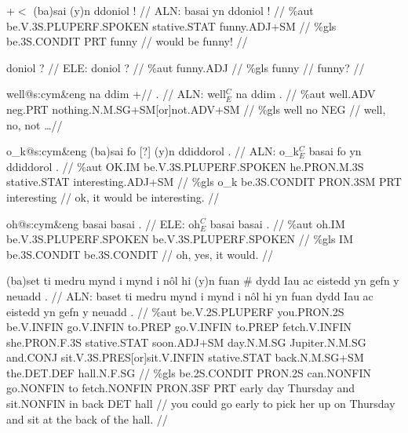 \documentclass[a4paper,10pt]{article}
\begin{document}
\ex
\begingl[lingstyle=gergl]
\glchat +$<$ (ba)sai (y)n ddoniol ! //
\glsurface ALN:  basai yn ddoniol !  //
\glauto \%aut  be{\scriptsize .V.3S.PLUPERF.SPOKEN} stative{\scriptsize .STAT} funny{\scriptsize .ADJ+SM}   //
\glmanual \%gls  be{\scriptsize .3S.CONDIT} PRT funny   //
\gleng would be funny! //
\endgl
\xe

\ex
\begingl[lingstyle=gergl]
\glchat doniol ? //
\glsurface ELE:  doniol ?  //
\glauto \%aut  funny{\scriptsize .ADJ}   //
\glmanual \%gls  funny   //
\gleng funny? //
\endgl
\xe

\ex
\begingl[lingstyle=gergl]
\glchat well@s:cym\&eng na ddim +// . //
\glsurface ALN:  well$^{C}_{E}$ na ddim .  //
\glauto \%aut  well{\scriptsize .ADV} neg{\scriptsize .PRT} nothing{\scriptsize .N.M.SG+SM[or]not.ADV+SM}   //
\glmanual \%gls  well no NEG   //
\gleng well, no, not \dots  //
\endgl
\xe

\ex
\begingl[lingstyle=gergl]
\glchat o\_k@s:cym\&eng (ba)sai fo [?] (y)n ddiddorol . //
\glsurface ALN:  o\_k$^{C}_{E}$ basai fo yn ddiddorol .  //
\glauto \%aut  OK{\scriptsize .IM} be{\scriptsize .V.3S.PLUPERF.SPOKEN} he{\scriptsize .PRON.M.3S} stative{\scriptsize .STAT} interesting{\scriptsize .ADJ+SM}   //
\glmanual \%gls  o\_k be{\scriptsize .3S.CONDIT} PRON{\scriptsize .3SM} PRT interesting   //
\gleng ok, it would be interesting. //
\endgl
\xe

\ex
\begingl[lingstyle=gergl]
\glchat oh@s:cym\&eng basai basai . //
\glsurface ELE:  oh$^{C}_{E}$ basai basai .  //
\glauto \%aut  oh{\scriptsize .IM} be{\scriptsize .V.3S.PLUPERF.SPOKEN} be{\scriptsize .V.3S.PLUPERF.SPOKEN}   //
\glmanual \%gls  IM be{\scriptsize .3S.CONDIT} be{\scriptsize .3S.CONDIT}   //
\gleng oh, yes, it would. //
\endgl
\xe

\ex
\begingl[lingstyle=gergl]
\glchat (ba)set ti medru mynd i mynd i nôl hi (y)n fuan \# dydd Iau ac eistedd yn gefn y neuadd . //
\glsurface ALN:  baset ti medru mynd i mynd i nôl hi yn fuan dydd Iau ac eistedd yn gefn y neuadd .  //
\glauto \%aut  be{\scriptsize .V.2S.PLUPERF} you{\scriptsize .PRON.2S} be{\scriptsize .V.INFIN} go{\scriptsize .V.INFIN} to{\scriptsize .PREP} go{\scriptsize .V.INFIN} to{\scriptsize .PREP} fetch{\scriptsize .V.INFIN} she{\scriptsize .PRON.F.3S} stative{\scriptsize .STAT} soon{\scriptsize .ADJ+SM} day{\scriptsize .N.M.SG} Jupiter{\scriptsize .N.M.SG} and{\scriptsize .CONJ} sit{\scriptsize .V.3S.PRES[or]sit.V.INFIN} stative{\scriptsize .STAT} back{\scriptsize .N.M.SG+SM} the{\scriptsize .DET.DEF} hall{\scriptsize .N.F.SG}   //
\glmanual \%gls  be{\scriptsize .2S.CONDIT} PRON{\scriptsize .2S} can{\scriptsize .NONFIN} go{\scriptsize .NONFIN} to fetch{\scriptsize .NONFIN} PRON{\scriptsize .3SF} PRT early day Thursday and sit{\scriptsize .NONFIN} in back DET hall     //
\gleng you could go early to pick her up on Thursday and sit at the back of the hall. //
\endgl
\xe
\end{document}
